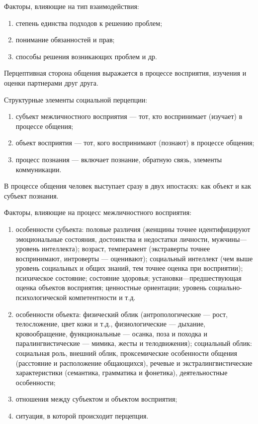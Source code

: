 Факторы, влияющие на тип взаимодействия:
\begin{enumerate}
	\item степень единства подходов к решению проблем;
	\item понимание обязанностей и прав;
	\item способы решения возникающих проблем и др.
\end{enumerate}

Перцептивная сторона общения выражается в процессе восприятия, изучения и оценки партнерами друг друга.

Структурные элементы социальной перцепции:
\begin{enumerate}
	\item субъект межличностного восприятия — тот, кто воспринимает (изучает) в процессе общения;
	\item объект восприятия — тот, кого воспринимают (познают) в процессе общения;
	\item процесс познания — включает познание, обратную связь, элементы коммуникации.
\end{enumerate}

В процессе общения человек выступает сразу в двух ипостасях: как объект и как субъект познания.

Факторы, влияющие на процесс межличностного восприятия:
\begin{enumerate}
	\item особенности субъекта: половые различия (женщины точнее идентифицируют эмоциональные состояния, достоинства и недостатки личности, мужчины—уровень интеллекта); возраст, темперамент (экстраверты точнее воспринимают, интроверты — оценивают); социальный интеллект (чем выше уровень социальных и общих знаний, тем точнее оценка при восприятии); психическое состояние; состояние здоровья; установки—предшествующая оценка объектов восприятия; ценностные ориентации; уровень социально-психологической компетентности и т.д.
	\item особенности объекта: физический облик (антропологические — рост, телосложение, цвет кожи и т.д., физиологические — дыхание, кровообращение, функциональные — осанка, поза и походка и паралингвистические — мимика, жесты и телодвижения); социальный облик: социальная роль, внешний облик, проксемические особенности общения (расстояние и расположение общающихся), речевые и экстралингвистические характеристики (семантика, грамматика и фонетика), деятельностные особенности;
	\item отношения между субъектом и объектом восприятия;
	\item ситуация, в которой происходит перцепция.
\end{enumerate}

